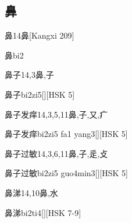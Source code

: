 \subsection*{鼻}

\begin{Entry}{鼻}{14}{⿐}[Kangxi 209]
  \begin{Phonetics}{鼻}{bi2}
  \end{Phonetics}
\end{Entry}

\begin{Entry}{鼻子}{14,3}{⿐,⼦}
  \begin{Phonetics}{鼻子}{bi2zi5}[][HSK 5]
  \end{Phonetics}
\end{Entry}

\begin{Entry}{鼻子发痒}{14,3,5,11}{⿐,⼦,⼜,⽧}
  \begin{Phonetics}{鼻子发痒}{bi2zi5 fa1 yang3}[][HSK 5]
  \end{Phonetics}
\end{Entry}

\begin{Entry}{鼻子过敏}{14,3,6,11}{⿐,⼦,⾡,⽁}
  \begin{Phonetics}{鼻子过敏}{bi2zi5 guo4min3}[][HSK 5]
  \end{Phonetics}
\end{Entry}

\begin{Entry}{鼻涕}{14,10}{⿐,⽔}
  \begin{Phonetics}{鼻涕}{bi2ti4}[][HSK 7-9]
  \end{Phonetics}
\end{Entry}


